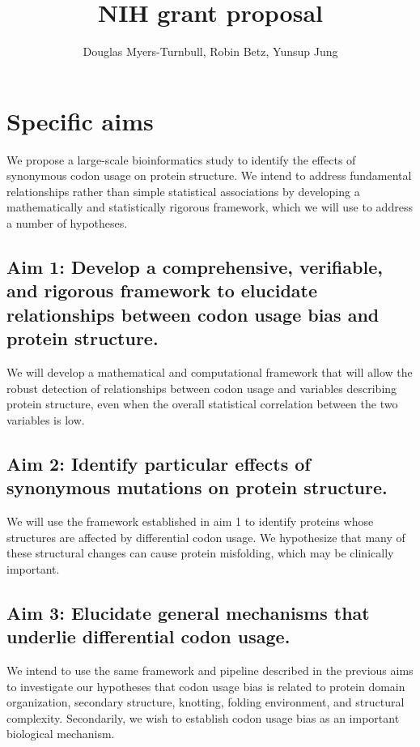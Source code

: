 \documentclass[11pt]{nih}
\title{\textbf{NIH grant proposal}}
\author{Douglas Myers-Turnbull, Robin Betz, Yunsup Jung}
\date{}
\begin{document}
\maketitle




\section{Specific aims}


We propose a large-scale bioinformatics study to identify the effects of synonymous codon usage on protein structure. We intend to address fundamental relationships rather than simple statistical associations by developing a mathematically and statistically rigorous framework, which we will use to address a number of hypotheses. 

\subsection{Aim 1: Develop a comprehensive, verifiable, and rigorous framework to elucidate relationships between codon usage bias and protein structure.}
We will develop a mathematical and computational framework that will allow the robust detection of relationships between codon usage and variables describing protein structure, even when the overall statistical correlation between the two variables is low.

\subsection{Aim 2: Identify particular effects of synonymous mutations on protein structure.}
We will use the framework established in aim 1 to identify proteins whose structures are affected by differential codon usage. We hypothesize that many of these structural changes can cause protein misfolding, which may be clinically important.

\subsection{Aim 3: Elucidate general mechanisms that underlie differential codon usage.}
We intend to use the same framework and pipeline described in the previous aims to investigate our hypotheses that codon usage bias is related to protein domain organization, secondary structure, knotting, folding environment, and structural complexity. Secondarily, we wish to establish codon usage bias as an important biological mechanism.
\end{document}
